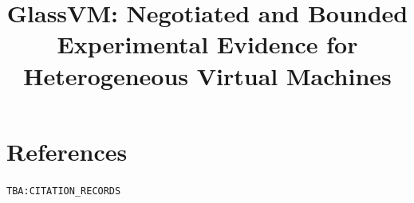 \documentclass[10pt]{article}
\title{GlassVM: Negotiated and Bounded Experimental Evidence for Heterogeneous Virtual Machines}
\author{}
\date{}
\begin{document}
\maketitle

\begin{abstract}

\end{abstract}












\section*{References}
\noindent\texttt{TBA:CITATION\_RECORDS}
\end{document}
